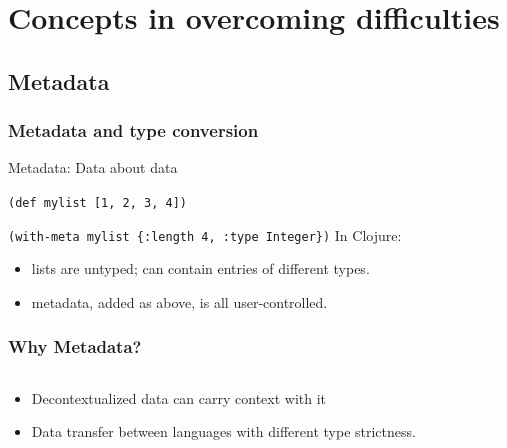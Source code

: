 \documentclass{beamer}
\newcommand{\linespace}{\vskip 0.25cm}
\begin{document}

\section[Handling interop]{Concepts in overcoming difficulties}

\subsection{Metadata}

\begin{frame}
  \frametitle{Metadata and type conversion}

	Metadata: Data about data
	
	{\tt (def mylist [1, 2, 3, 4])}
	
	{\tt (with-meta mylist \{:length 4, :type Integer\})}
	\linespace
	In Clojure:
	\begin{itemize}
	\item lists are untyped; can contain entries of different types.
	\item metadata, added as above, is all user-controlled.
	\end{itemize}
\end{frame}


\begin{frame}
    \frametitle{Why Metadata?}
  \begin{columns}
  \begin{column}{0.6\textwidth}

    \begin{itemize}   
    \item Decontextualized data can carry context with it
    \item Data transfer between languages with different type strictness.
    \end{itemize}
  \end{column}
  \begin{column}{0.6\textwidth}
  
  \end{column}
  
  \end{columns}
\end{frame}
\end{document}
